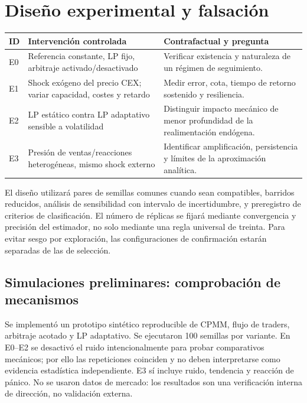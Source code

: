 \documentclass[11pt,a4paper]{article}
\begin{document}
\section{Diseño experimental y falsación}
\begin{table}[ht]
\centering\small
\begin{tabular}{p{.08\linewidth}p{.33\linewidth}p{.46\linewidth}}
\toprule ID & Intervención controlada & Contrafactual y pregunta \\\midrule
E0 & Referencia constante, LP fijo, arbitraje activado/desactivado & Verificar existencia y naturaleza de un régimen de seguimiento.\\
E1 & Shock exógeno del precio CEX; variar capacidad, costes y retardo & Medir error, cota, tiempo de retorno sostenido y resiliencia.\\
E2 & LP estático contra LP adaptativo sensible a volatilidad & Distinguir impacto mecánico de menor profundidad de la realimentación endógena.\\
E3 & Presión de ventas/reacciones heterogéneas, mismo shock externo & Identificar amplificación, persistencia y límites de la aproximación analítica.\\
\bottomrule
\end{tabular}
\end{table}
El diseño utilizará pares de semillas comunes cuando sean compatibles, barridos reducidos, análisis de sensibilidad con intervalo de incertidumbre, y preregistro de criterios de clasificación. El número de réplicas se fijará mediante convergencia y precisión del estimador, no solo mediante una regla universal de treinta. Para evitar sesgo por exploración, las configuraciones de confirmación estarán separadas de las de selección.
\subsection{Simulaciones preliminares: comprobación de mecanismos}
Se implementó un prototipo sintético reproducible de CPMM, flujo de traders, arbitraje acotado y LP adaptativo. Se ejecutaron 100 semillas por variante. En E0--E2 se desactivó el ruido intencionalmente para probar comparativos mecánicos; por ello las repeticiones coinciden y no deben interpretarse como evidencia estadística independiente. E3 sí incluye ruido, tendencia y reacción de pánico. No se usaron datos de mercado: los resultados son una verificación interna de dirección, no validación externa.
\end{document}
